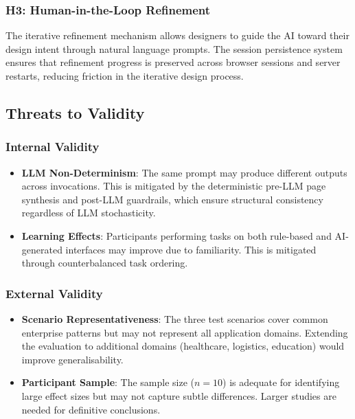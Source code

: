 \subsubsection{H3: Human-in-the-Loop Refinement}

The iterative refinement mechanism allows designers to guide the AI toward their design intent through natural language prompts. The session persistence system ensures that refinement progress is preserved across browser sessions and server restarts, reducing friction in the iterative design process.


\subsection{Threats to Validity}

\subsubsection{Internal Validity}
\begin{itemize}
    \item \textbf{LLM Non-Determinism}: The same prompt may produce different outputs across invocations. This is mitigated by the deterministic pre-LLM page synthesis and post-LLM guardrails, which ensure structural consistency regardless of LLM stochasticity.
    \item \textbf{Learning Effects}: Participants performing tasks on both rule-based and AI-generated interfaces may improve due to familiarity. This is mitigated through counterbalanced task ordering.
\end{itemize}

\subsubsection{External Validity}
\begin{itemize}
    \item \textbf{Scenario Representativeness}: The three test scenarios cover common enterprise patterns but may not represent all application domains. Extending the evaluation to additional domains (healthcare, logistics, education) would improve generalisability.
    \item \textbf{Participant Sample}: The sample size ($n = 10$) is adequate for identifying large effect sizes but may not capture subtle differences. Larger studies are needed for definitive conclusions.
\end{itemize}

